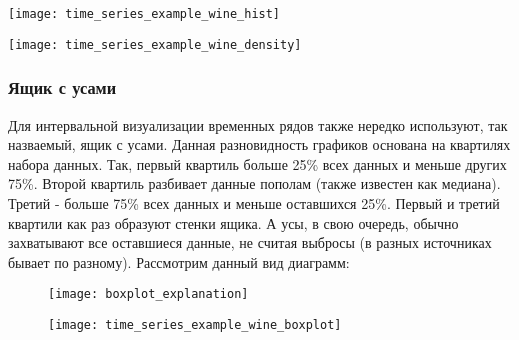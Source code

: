 \begin{center}
    \begin{minipage}{0.4\textwidth}
        \centering
        \texttt{[image: time\_series\_example\_wine\_hist]}
        \label{fig:time_series_example_wine_hist}
    \end{minipage}
    \hfill
    \begin{minipage}{0.4\textwidth}
        \centering
        \texttt{[image: time\_series\_example\_wine\_density]}
        \label{fig:time_series_example_wine_density}
    \end{minipage}
\end{center}

\subsubsection{Ящик с усами}

Для интервальной визуализации временных рядов также нередко используют, так 
назваемый, ящик с усами. Данная разновидность графиков основана на 
квартилях набора данных. Так, первый квартиль больше 25\% всех данных и 
меньше других 75\%. Второй квартиль разбивает данные пополам (также известен 
как медиана). Третий - больше 75\% всех данных и меньше оставшихся 25\%. Первый 
и третий квартили как раз образуют стенки ящика. А
\guillemotleft усы\guillemotright {}, в свою очередь, обычно
захватывают все оставшиеся данные, не считая 
выбросы (в разных источниках бывает по разному). Рассмотрим данный вид диаграмм:

\begin{figure}[h!]
    \centering
    \texttt{[image: boxplot\_explanation]}
    \label{fig:boxplot_explanation}
\end{figure}

\newpage

\begin{figure}[h!]
    \centering
    \texttt{[image: time\_series\_example\_wine\_boxplot]}
    \label{fig:time_series_example_wine_boxplot}
\end{figure}


